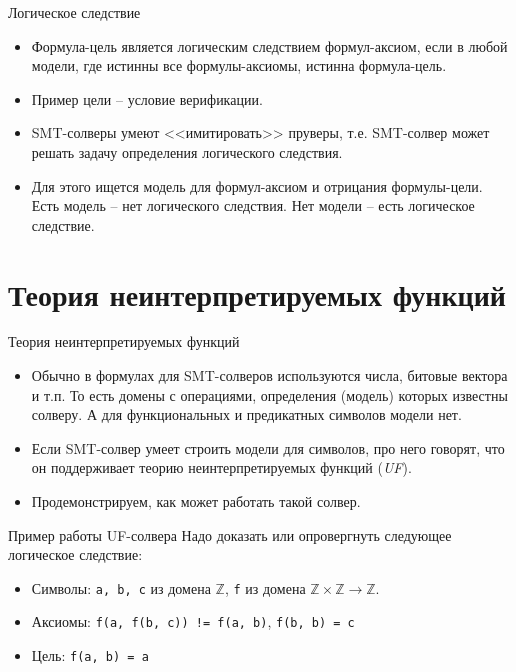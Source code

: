 \documentclass[hyperref={unicode=true}]{beamer}
\begin{document}
    \begin{frame}{Логическое следствие}
    \begin{itemize}
    \item
    Формула-цель является логическим следствием формул-аксиом,
    если в любой модели, где истинны все формулы-аксиомы,
    истинна формула-цель.
    \item
    Пример цели -- условие верификации.
    \item
    SMT-солверы умеют <<имитировать>> пруверы, т.е.
    SMT-солвер может решать задачу определения логического следствия.
    \item
    Для этого ищется модель для формул-аксиом и отрицания формулы-цели.
    Есть модель -- нет логического следствия. Нет модели
    -- есть логическое следствие.
    \end{itemize}
    \end{frame}

    \section{Теория неинтерпретируемых функций}

    \begin{frame}{Теория неинтерпретируемых функций}
    \begin{itemize}
    \item
    Обычно в формулах для SMT-солверов используются числа,
    битовые вектора и т.п. То есть домены с операциями,
    определения (модель) которых известны солверу.
    А для функциональных и предикатных символов модели нет.
    \item
    Если SMT-солвер умеет строить модели для символов,
    про него говорят, что он поддерживает
    теорию неинтерпретируемых функций (\textsl{UF}).
    \item
    Продемонстрируем, как может работать такой солвер.
    \end{itemize}
    \end{frame}

    \begin{frame}{Пример работы UF-солвера}
    Надо доказать или опровергнуть следующее
    логическое следствие:
    \begin{itemize}
    \item
    Символы: \texttt{a, b, c} из домена $\mathbb{Z}$,
    \texttt{f} из домена $\mathbb{Z}\times\mathbb{Z}
    \rightarrow \mathbb{Z}$.
    \item
    Аксиомы: \texttt{f(a, f(b, c)) != f(a, b)},
    \texttt{f(b, b) = c}
    \item
    Цель: \texttt{f(a, b) = a}
    \end{itemize}
    \end{frame}
\end{document}
